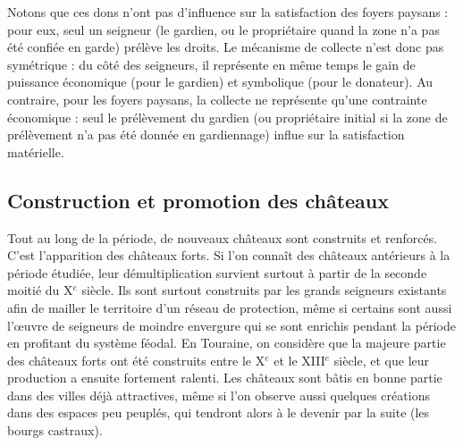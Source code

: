 \begin{tcolorbox}[breakable,left=0pt,right=0pt,top=0pt,bottom=0pt,
	colback=gray!15,colframe=gray!15,width=\dimexpr\textwidth\relax, 
	enlarge left by=0mm, boxsep=5pt,arc=0pt,outer arc=0pt]
	\medskip
	Notons que ces dons n'ont pas d'influence sur la satisfaction des foyers paysans : pour eux, seul un seigneur (le gardien, ou le propriétaire quand la zone n'a pas été confiée en garde) prélève les droits.
	Le mécanisme de collecte n'est donc pas symétrique : du côté des seigneurs, il représente en même temps le gain de puissance économique (pour le gardien) et symbolique (pour le donateur).
	Au contraire, pour les foyers paysans, la collecte ne représente qu'une contrainte économique : seul le prélèvement du gardien (ou propriétaire initial si la zone de prélèvement n'a pas été donnée en gardiennage) influe sur la satisfaction matérielle.
\end{tcolorbox}

\subsection{Construction et promotion des châteaux}

Tout au long de la période, de nouveaux châteaux sont construits et renforcés. C'est l'apparition des \og châteaux forts\fg{}.
Si l'on connaît des châteaux antérieurs à la période étudiée, leur démultiplication survient surtout à partir de la seconde moitié du X$^e$ siècle.
Ils sont surtout construits par les grands seigneurs existants afin de mailler le territoire d'un réseau de protection, même si certains sont aussi l'œuvre de seigneurs de moindre envergure qui se sont enrichis pendant la période en profitant du système féodal.
En Touraine, on considère que la majeure partie des châteaux forts ont été construits entre le X$^e$ et le XIII$^e$ siècle, et que leur production a ensuite fortement ralenti.
Les châteaux sont bâtis en bonne partie dans des villes déjà attractives, même si l'on observe aussi quelques créations dans des espaces peu peuplés, qui tendront alors à le devenir par la suite (les bourgs castraux).

